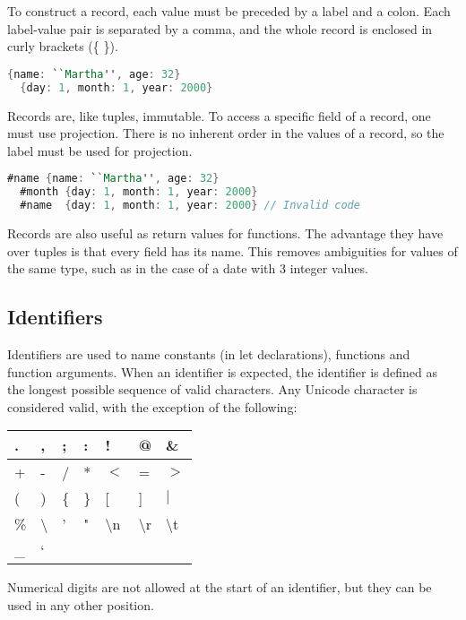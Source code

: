 \documentclass{article}
\begin{document}
To construct a record, each value must be preceded by a label and a colon.
Each label-value pair is separated by a comma, and the whole record is enclosed in curly brackets (\{ \}).

\begin{lstlisting}[language=V]
  {name: ``Martha'', age: 32}
  {day: 1, month: 1, year: 2000}
\end{lstlisting}

Records are, like tuples, immutable.
To access a specific field of a record, one must use projection.
There is no inherent order in the values of a record, so the label must be used for projection.

\begin{lstlisting}[language=V]
  #name {name: ``Martha'', age: 32}
  #month {day: 1, month: 1, year: 2000}
  #name  {day: 1, month: 1, year: 2000} // Invalid code
\end{lstlisting}

Records are also useful as return values for functions.
The advantage they have over tuples is that every field has its name.
This removes ambiguities for values of the same type, such as in the case of a date with 3 integer values.

\subsection{Identifiers}

Identifiers are used to name constants (in let declarations), functions and function arguments.
When an identifier is expected, the identifier is defined as the longest possible sequence of valid characters.
Any Unicode character is considered valid, with the exception of the following:

\medskip

\begin{tabular}{|l|l|l|l|l|l|l|}
  \hline
  . & , & ; & : & ! & @ & \&\\
  \hline
  + & - & / & * & $<$ & = & $>$ \\
  \hline
  ( & ) & \{ & \} & [ & ] & $|$ \\
  \hline
  \% & \textbackslash & ' & " & \textbackslash n & \textbackslash r & \textbackslash t\\
  \hline
  \_ & \lq\\
  \hline
\end{tabular}

\bigskip

Numerical digits are not allowed at the start of an identifier, but they can be used in any other position.
\end{document}
